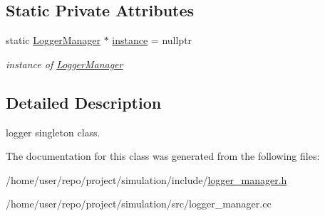 \subsection*{Static Private Attributes}
\begin{DoxyCompactItemize}
\item 
\mbox{\label{classLoggerManager_a9e429d7778db1d6723a8d137187abd5c}} 
static \hyperlink{classLoggerManager}{Logger\+Manager} $\ast$ \hyperlink{classLoggerManager_a9e429d7778db1d6723a8d137187abd5c}{instance} = nullptr
\begin{DoxyCompactList}\small\item\em instance of \hyperlink{classLoggerManager}{Logger\+Manager} \end{DoxyCompactList}\end{DoxyCompactItemize}


\subsection{Detailed Description}
logger singleton class. 

The documentation for this class was generated from the following files\+:\begin{DoxyCompactItemize}
\item 
/home/user/repo/project/simulation/include/\hyperlink{logger__manager_8h}{logger\+\_\+manager.\+h}\item 
/home/user/repo/project/simulation/src/logger\+\_\+manager.\+cc\end{DoxyCompactItemize}
